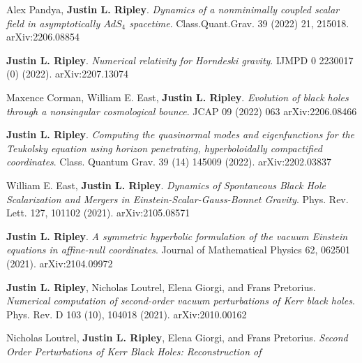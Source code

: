 \documentclass{my_cv}
\begin{document}
\begin{etaremune}
\item Alex Pandya, {\bf Justin L. Ripley}. 
   \emph{Dynamics of a nonminimally coupled scalar field in asymptotically
   $AdS_4$ spacetime}.
   Class.Quant.Grav. 39 (2022) 21, 215018.
   arXiv:2206.08854
\item {\bf Justin L. Ripley}. 
   \emph{Numerical relativity for Horndeski gravity}.
   IJMPD 0 2230017 (0) (2022).
   arXiv:2207.13074 
\item Maxence Corman, William E. East, {\bf Justin L. Ripley}. 
   \emph{Evolution of black holes through a nonsingular cosmological bounce}.
   JCAP 09 (2022) 063
   arXiv:2206.08466
\item {\bf Justin L. Ripley}. 
   \emph{Computing the quasinormal modes and eigenfunctions for the 
   Teukolsky equation using horizon penetrating, 
   hyperboloidally compactified coordinates}.
   Class. Quantum Grav. 39 (14) 145009 (2022).
   arXiv:2202.03837
\item William E. East, {\bf Justin L. Ripley}. 
   \emph{Dynamics of Spontaneous Black Hole Scalarization and Mergers
   in Einstein-Scalar-Gauss-Bonnet Gravity}.
   Phys. Rev. Lett. 127, 101102 (2021).
   arXiv:2105.08571
\item {\bf Justin L. Ripley}. 
   \emph{A symmetric hyperbolic formulation of the vacuum
      Einstein equations in affine-null coordinates}.
   Journal of Mathematical Physics 62, 062501 (2021).
   arXiv:2104.09972
\item {\bf Justin L. Ripley}, 
   Nicholas Loutrel, Elena Giorgi, and Frans Pretorius. 
   \emph{Numerical computation of second-order vacuum perturbations of
      Kerr black holes}.
   Phys. Rev. D 103 (10), 104018 (2021). 
   arXiv:2010.00162
\item Nicholas Loutrel, {\bf Justin L. Ripley}, 
   Elena Giorgi, and Frans Pretorius. 
   \emph{Second Order Perturbations of Kerr Black Holes: Reconstruction of
}
\end{etaremune}
\end{document}

